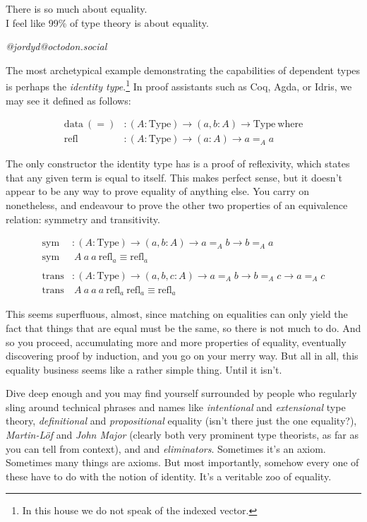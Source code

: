 \documentclass{report}
\newcommand{\const}[1]{\text{#1}}
\newcommand{\data}{\const{data}}
\newcommand{\Type}{\const{Type}}
\newcommand{\where}{\const{where}}
\newcommand{\refl}{\const{refl}}
\newcommand{\jelim}{\const{J}\xspace}
\newcommand{\kelim}{\const{K}\xspace}
\begin{document}
\epigraph{There is so much about equality.\\ I feel like 99\% of type theory is about equality.}{\textit{@jordyd@octodon.social}}

The most archetypical example demonstrating the capabilities of dependent types is perhaps the \emph{identity type}.\footnote{In this house we do not speak of the indexed vector.} In proof assistants such as Coq, Agda, or Idris, we may see it defined as follows:

\begin{align*}
    \data ~ (=) &: (A : \Type) \to (a, b : A) \to \Type ~ \where \\
    \refl &: (A : \Type) \to (a : A) \to a =_A a
\end{align*}

The only constructor the identity type has is a proof of reflexivity, which states that any given term is equal to itself. This makes perfect sense, but it doesn't appear to be any way to prove equality of anything else. You carry on nonetheless, and endeavour to prove the other two properties of an equivalence relation: symmetry and transitivity.

\begin{align*}
    \text{sym} &: (A : \Type) \to (a, b : A) \to a =_A b \to b =_A a \\
    \text{sym} &~ A ~ a ~ a ~ \refl_a \equiv \refl_a \\
    \\
    \text{trans} &: (A : \Type) \to (a, b, c : A) \to a =_A b \to b =_A c \to a =_A c \\
    \text{trans} &~ A ~ a ~ a ~ a ~ \refl_a ~ \refl_a \equiv \refl_a
\end{align*}

This seems superfluous, almost, since matching on equalities can only yield the fact that things that are equal must be the same, so there is not much to do. And so you proceed, accumulating more and more properties of equality, eventually discovering proof by induction, and you go on your merry way. But all in all, this equality business seems like a rather simple thing. Until it isn't.

Dive deep enough and you may find yourself surrounded by people who regularly sling around technical phrases and names like \emph{intentional} and \emph{extensional} type theory, \emph{definitional} and \emph{propositional} equality (isn't there just the one equality?), \emph{Martin-L\"of} and \emph{John Major} (clearly both very prominent type theorists, as far as you can tell from context), and \emph{\jelim} and \emph{\kelim eliminators}. Sometimes it's an axiom. Sometimes many things are axioms. But most importantly, somehow every one of these have to do with the notion of identity. It's a veritable zoo of equality.
\end{document}
